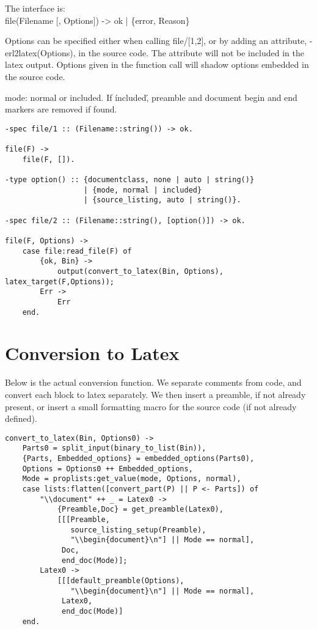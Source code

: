 \documentclass[a4paper,12pt]{article}
\newenvironment{mylisting}
{\begin{list}{}{\setlength{\leftmargin}{1em}}\item\scriptsize\bfseries}
{\end{list}}
\begin{document}
The interface is:\\
file(Filename [, Options]) -> ok | \{error, Reason\}

Options can be specified either when calling file/[1,2], or 
by adding an attribute, -erl2latex(Options), in the source code.
The attribute will not be included in the latex output.
Options given in the function call will shadow options embedded in
the source code.

mode: normal or included. If \'included\', preamble and document 
begin and end markers are removed if found.
\begin{mylisting}
\begin{verbatim}
-spec file/1 :: (Filename::string()) -> ok.

file(F) ->
    file(F, []).

-type option() :: {documentclass, none | auto | string()}
                  | {mode, normal | included}
                  | {source_listing, auto | string()}.

-spec file/2 :: (Filename::string(), [option()]) -> ok.

file(F, Options) ->
    case file:read_file(F) of
        {ok, Bin} ->
            output(convert_to_latex(Bin, Options), latex_target(F,Options));
        Err ->
            Err
    end.
\end{verbatim}
\end{mylisting}

\section{Conversion to Latex}
Below is the actual conversion function. We separate comments from code,
and convert each block to latex separately. We then insert a preamble,
if not already present, or insert a small formatting macro for the 
source code (if not already defined).
\begin{mylisting}
\begin{verbatim}
convert_to_latex(Bin, Options0) ->
    Parts0 = split_input(binary_to_list(Bin)),
    {Parts, Embedded_options} = embedded_options(Parts0),
    Options = Options0 ++ Embedded_options,
    Mode = proplists:get_value(mode, Options, normal),
    case lists:flatten([convert_part(P) || P <- Parts]) of
        "\\document" ++ _ = Latex0 ->
            {Preamble,Doc} = get_preamble(Latex0),
            [[[Preamble,
               source_listing_setup(Preamble),
               "\\begin{document}\n"] || Mode == normal],
             Doc,
             end_doc(Mode)];
        Latex0 ->
            [[[default_preamble(Options),
               "\\begin{document}\n"] || Mode == normal],
             Latex0,
             end_doc(Mode)]
    end.
\end{verbatim}
\end{mylisting}
\end{document}
